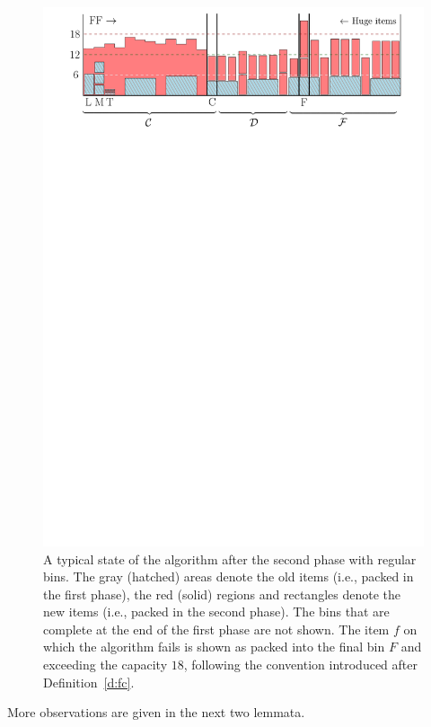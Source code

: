\begin{figure}[th]
\begin{center}
\includegraphics[width=1\textwidth]{img/second_phase.pdf}
\end{center}
\caption{A typical state of the algorithm after the second phase with regular
  bins. The gray (hatched) areas denote the old items (i.e., packed in
  the first phase), the red (solid) regions and rectangles denote the
  new items (i.e., packed in the second phase). The bins that are
  complete at the end of the first phase are not shown. The item $f$
  on which the algorithm fails is shown as packed into the final bin
  $F$ and exceeding the capacity $18$, following the convention
  introduced after Definition~\ref{d:fc}.}
\label{fig:2}
\end{figure}

More observations are given in the next two lemmata.

